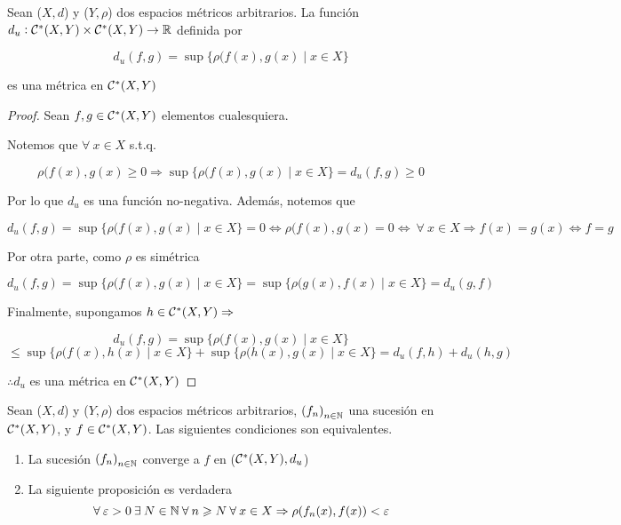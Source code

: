 \begin{theorem}
    Sean ($X,d$) y ($Y,\rho$) dos espacios métricos arbitrarios. La función $d_u : {\mathcal{C}}^{\ast}(X,Y) \times {\ensuremath{\mathcal{C}}}^{\ast}(X,Y) \to \mathbb{R}$ definida por

    $$d_u(f,g) = \sup \{ \rho(f(x),g(x) \mid x \in X \}$$

    es una métrica en ${\mathcal{C}}^{\ast}(X,Y)$
\end{theorem}

\begin{proof}
    Sean $f,g \in {\ensuremath{\mathcal{C}}}^{\ast}(X,Y)$ elementos cualesquiera. 

    Notemos que $\forall \: x \in X$ s.t.q.

    $$\rho(f(x),g(x) \geqslant 0 \Rightarrow \sup \{ \rho(f(x),g(x) \mid x \in X \} = d_u(f,g) \geqslant 0$$

    Por lo que $d_u$ es una función no-negativa. Además, notemos que
    
    $$d_u(f,g) = \sup \{ \rho(f(x),g(x) \mid x \in X \} = 0 \iff \rho(f(x),g(x) = 0 \iff \: \forall \: x \in X \Rightarrow f(x) = g(x) \iff f = g$$

    Por otra parte, como $\rho$ es simétrica

    $$d_u(f,g) = \sup \{ \rho(f(x),g(x) \mid x \in X \} = \sup \{ \rho(g(x),f(x) \mid x \in X \} = d_u(g,f) $$

    Finalmente, supongamos $h \in  {\ensuremath{\mathcal{C}}}^{\ast}(X,Y) \Rightarrow$

    $$d_u(f,g) = \sup \{ \rho(f(x),g(x) \mid x \in X \} $$
    $$ \leqslant \sup \{ \rho(f(x),h(x) \mid x \in X \} + \sup \{ \rho(h(x),g(x) \mid x \in X \} = d_u(f,h)+ d_u(h,g)$$

    $\therefore d_u$ es una métrica en $ {\mathcal{C}}^{\ast}(X,Y)$
\end{proof}

\begin{theorem} \label{theom57}
    Sean ($X,d$) y ($Y,\rho$) dos espacios métricos arbitrarios, ${\left(f_n\right)}_{n \in \mathbb{N}}$ una sucesión en $ {\mathcal{C}}^{\ast}(X,Y)$, y $f \in {\ensuremath{\mathcal{C}}}^{\ast}(X,Y)$. Las siguientes condiciones son equivalentes.

    \begin{enumerate}
        \item La sucesión ${\left(f_n\right)}_{n \in \mathbb{N}}$ converge a $f$ en ($ {\mathcal{C}}^{\ast}(X,Y), d_u$)
        \item La siguiente proposición es verdadera
        $$\forall \: \varepsilon > 0 \: \exists \: N \in \mathbb{N} \: \forall \: n \geqslant N \: \forall \: x \in X \Rightarrow \rho(f_n(x),f(x)) < \varepsilon$$
    \end{enumerate}
\end{theorem}

